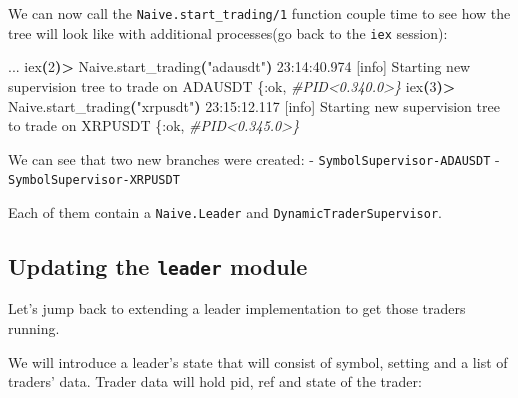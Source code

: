 \documentclass[
  oneside]{book}
\newenvironment{Shaded}{\begin{snugshade}}{\end{snugshade}}
\newcommand{\CommentTok}[1]{\textcolor[rgb]{0.56,0.35,0.01}{\textit{#1}}}
\newcommand{\ErrorTok}[1]{\textcolor[rgb]{0.64,0.00,0.00}{\textbf{#1}}}
\newcommand{\ExtensionTok}[1]{#1}
\newcommand{\KeywordTok}[1]{\textcolor[rgb]{0.13,0.29,0.53}{\textbf{#1}}}
\newcommand{\NormalTok}[1]{#1}
\newcommand{\OperatorTok}[1]{\textcolor[rgb]{0.81,0.36,0.00}{\textbf{#1}}}
\newcommand{\StringTok}[1]{\textcolor[rgb]{0.31,0.60,0.02}{#1}}
\begin{document}
We can now call the \texttt{Naive.start\_trading/1} function couple time to see how the tree will look like with additional processes(go back to the \texttt{iex} session):

\begin{Shaded}
\begin{Highlighting}[]
\ExtensionTok{...}
\ExtensionTok{iex}\ErrorTok{(}\ExtensionTok{2}\KeywordTok{)}\OperatorTok{\textgreater{}}\NormalTok{ Naive.start\_trading}\KeywordTok{(}\StringTok{"adausdt"}\KeywordTok{)}
\ExtensionTok{23:14:40.974}\NormalTok{ [info]  Starting new supervision tree to trade on ADAUSDT}
\ExtensionTok{\{:ok,} \CommentTok{\#PID\textless{}0.340.0\textgreater{}\}}
\ExtensionTok{iex}\ErrorTok{(}\ExtensionTok{3}\KeywordTok{)}\OperatorTok{\textgreater{}}\NormalTok{ Naive.start\_trading}\KeywordTok{(}\StringTok{"xrpusdt"}\KeywordTok{)}
\ExtensionTok{23:15:12.117}\NormalTok{ [info]  Starting new supervision tree to trade on XRPUSDT}
\ExtensionTok{\{:ok,} \CommentTok{\#PID\textless{}0.345.0\textgreater{}\}}
\end{Highlighting}
\end{Shaded}

We can see that two new branches were created:
- \texttt{SymbolSupervisor-ADAUSDT}
- \texttt{SymbolSupervisor-XRPUSDT}

Each of them contain a \texttt{Naive.Leader} and \texttt{DynamicTraderSupervisor}.

\hypertarget{updating-the-leader-module}{%
\subsection{\texorpdfstring{Updating the \texttt{leader} module}{Updating the leader module}}\label{updating-the-leader-module}}

Let's jump back to extending a leader implementation to get those traders running.

We will introduce a leader's state that will consist of symbol, setting and a list of traders' data. Trader data will hold pid, ref and state of the trader:
\end{document}
